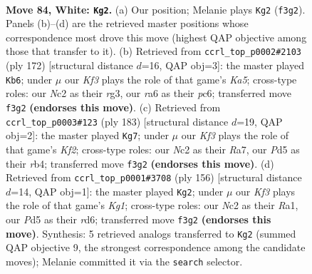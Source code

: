 \documentclass[11pt]{article}
\begin{document}
\clearpage

\begin{figure}[p]\centering
\begin{subfigure}{0.46\textwidth}\centering
\resizebox{\linewidth}{!}{%
\newchessgame
\chessboard[
  setfen={1R6/6p1/r4p2/3P1k1p/7P/5KP1/2N5/8 w - - 7 84},
  showmover=false,
  pgfstyle=straightmove, color=movearrow, markmove={f3-g2}
]}
\caption{}
\end{subfigure}\hfill
\begin{subfigure}{0.46\textwidth}\centering
\resizebox{\linewidth}{!}{%
\newchessgame
\chessboard[
  setfen={4R3/8/2p2k2/K1Pp1p2/3P1Pp1/6r1/8/8 w - - 0 87},
  showmover=false,
  pgfstyle=straightmove, color=movearrow, markmove={a5-b6}
]}
\caption{}
\end{subfigure}
\\[4pt]
\begin{subfigure}{0.46\textwidth}\centering
\resizebox{\linewidth}{!}{%
\newchessgame
\chessboard[
  setfen={8/r4k2/6p1/6Pp/1R5P/5PK1/8/8 b - - 98 92},
  showmover=false,
  pgfstyle=straightmove, color=movearrow, markmove={f7-g7}
]}
\caption{}
\end{subfigure}\hfill
\begin{subfigure}{0.46\textwidth}\centering
\resizebox{\linewidth}{!}{%
\newchessgame
\chessboard[
  setfen={8/8/3rp1k1/6p1/6Pp/7P/5P2/R5K1 w - - 45 79},
  showmover=false,
  pgfstyle=straightmove, color=movearrow, markmove={g1-g2}
]}
\caption{}
\end{subfigure}
\caption{\textbf{Move 84, White: \texttt{Kg2}.} (a) Our position; Melanie plays \texttt{Kg2} (\texttt{f3g2}). Panels (b)--(d) are the retrieved master positions whose correspondence most drove this move (highest QAP objective among those that transfer to it). (b) Retrieved from \texttt{ccrl\_top\_p0002\#2103} (ply 172) [structural distance $d$=16, QAP obj=3]: the master played \texttt{Kb6}; under $\mu$ our \emph{Kf3} plays the role of that game's \emph{Ka5}; cross-type roles: our \emph{N}c2 as their \emph{r}g3, our \emph{r}a6 as their \emph{p}c6; transferred move \texttt{f3g2} \textbf{(endorses this move)}. (c) Retrieved from \texttt{ccrl\_top\_p0003\#123} (ply 183) [structural distance $d$=19, QAP obj=2]: the master played \texttt{Kg7}; under $\mu$ our \emph{Kf3} plays the role of that game's \emph{Kf2}; cross-type roles: our \emph{N}c2 as their \emph{R}a7, our \emph{P}d5 as their \emph{r}b4; transferred move \texttt{f3g2} \textbf{(endorses this move)}. (d) Retrieved from \texttt{ccrl\_top\_p0001\#3708} (ply 156) [structural distance $d$=14, QAP obj=1]: the master played \texttt{Kg2}; under $\mu$ our \emph{Kf3} plays the role of that game's \emph{Kg1}; cross-type roles: our \emph{N}c2 as their \emph{R}a1, our \emph{P}d5 as their \emph{r}d6; transferred move \texttt{f3g2} \textbf{(endorses this move)}. Synthesis: 5 retrieved analogs transferred to \texttt{Kg2} (summed QAP objective 9, the strongest correspondence among the candidate moves); Melanie committed it via the \texttt{search} selector.}
\label{fig:thought-m166}
\end{figure}
\end{document}
